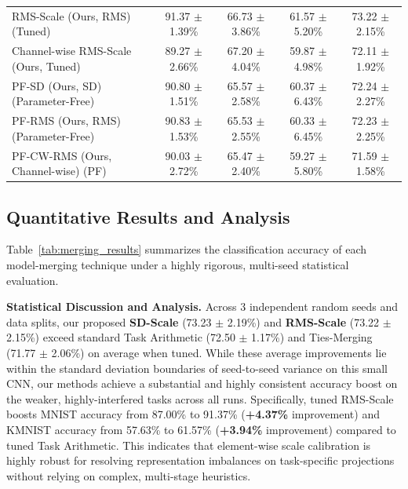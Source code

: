 \begin{table}[t]
\begin{center}
\begin{small}
\begin{sc}
\begin{tabular}{lcccc}
RMS-Scale (Ours, RMS) (Tuned) & 91.37 $\pm$ 1.39\% & 66.73 $\pm$ 3.86\% & 61.57 $\pm$ 5.20\% & 73.22 $\pm$ 2.15\% \\
Channel-wise RMS-Scale (Ours, Tuned) & 89.27 $\pm$ 2.66\% & 67.20 $\pm$ 4.04\% & 59.87 $\pm$ 4.98\% & 72.11 $\pm$ 1.92\% \\
\midrule
PF-SD (Ours, SD) (Parameter-Free) & 90.80 $\pm$ 1.51\% & 65.57 $\pm$ 2.58\% & 60.37 $\pm$ 6.43\% & 72.24 $\pm$ 2.27\% \\
PF-RMS (Ours, RMS) (Parameter-Free) & 90.83 $\pm$ 1.53\% & 65.53 $\pm$ 2.55\% & 60.33 $\pm$ 6.45\% & 72.23 $\pm$ 2.25\% \\
PF-CW-RMS (Ours, Channel-wise) (PF) & 90.03 $\pm$ 2.72\% & 65.47 $\pm$ 2.40\% & 59.27 $\pm$ 5.80\% & 71.59 $\pm$ 1.58\% \\
\bottomrule
\end{tabular}
\end{sc}
\end{small}
\end{center}
\vskip -0.1in
\end{table}

\subsection{Quantitative Results and Analysis}

Table~\ref{tab:merging_results} summarizes the classification accuracy of each model-merging technique under a highly rigorous, multi-seed statistical evaluation.

\textbf{Statistical Discussion and Analysis.} 
Across 3 independent random seeds and data splits, our proposed \textbf{SD-Scale} (73.23 $\pm$ 2.19\%) and \textbf{RMS-Scale} (73.22 $\pm$ 2.15\%) exceed standard Task Arithmetic (72.50 $\pm$ 1.17\%) and Ties-Merging (71.77 $\pm$ 2.06\%) on average when tuned. While these average improvements lie within the standard deviation boundaries of seed-to-seed variance on this small CNN, our methods achieve a substantial and highly consistent accuracy boost on the weaker, highly-interfered tasks across all runs. Specifically, tuned RMS-Scale boosts MNIST accuracy from 87.00\% to 91.37\% (\textbf{+4.37\%} improvement) and KMNIST accuracy from 57.63\% to 61.57\% (\textbf{+3.94\%} improvement) compared to tuned Task Arithmetic. This indicates that element-wise scale calibration is highly robust for resolving representation imbalances on task-specific projections without relying on complex, multi-stage heuristics.

